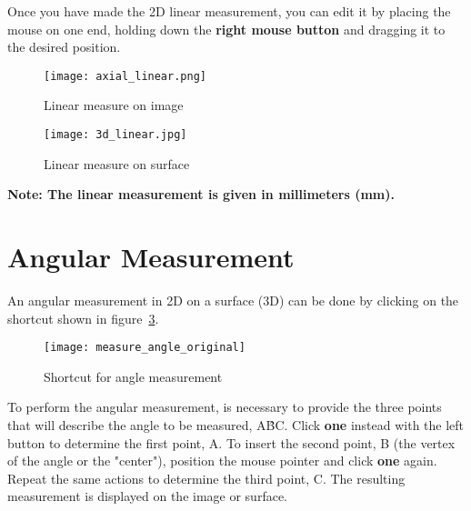 Once you have made the 2D linear measurement, you can edit it by placing the mouse on one end, holding down the \textbf{right mouse button} and dragging it to the desired position.

\begin{figure}[!htb]
\centering
\texttt{[image: axial\_linear.png]}
\caption{Linear measure on image}
\label{fig:axial_linear}
\end{figure}

\begin{figure}[!htb]
\centering
\texttt{[image: 3d\_linear.jpg]}
\caption{Linear measure on surface}
\label{fig:3d_linear}
\end{figure}

\textbf{Note: The linear measurement is given in millimeters (mm).}

\section{Angular Measurement}


An angular measurement in 2D on a surface (3D) can be done by clicking on the shortcut shown in figure~\ref{fig:atalho_angular}.

\begin{figure}[!htb]
\centering
\texttt{[image: measure\_angle\_original]}
\caption{Shortcut for angle measurement}
\label{fig:atalho_angular}
\end{figure}


To perform the angular measurement, is necessary to provide the three points that will describe the angle to be measured, A\^{B}C. Click \textbf{one} instead with the left button to determine the first point, A. To insert the second point, B (the vertex of the angle or the "center"), position the mouse pointer and click \textbf{one} again. Repeat the same actions to determine the third point, C. The resulting measurement is displayed on the image or surface.

